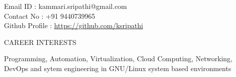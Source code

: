 \documentclass{resume} %
\newcommand{\blank}[1]{\hspace*{#1}}
\begin{document}
\blank{5 cm}
{Email ID} \blank{0.7 cm} :
kammari.sripathi@gmail.com \\
\blank{5 cm} 
{Contact No} \blank{0.3 cm} :
+91 9440739965 \\
\blank{5 cm}
{Github Profile : }
\url{https://github.com/ksripathi}
\sectionlineskip \\


\begin{rSection}{CAREER INTERESTS}
  
  { Programming, Automation, Virtualization, Cloud Computing,
    Networking, DevOps and sytem engineering in GNU/Linux system based
    environments }

\end{rSection}

\end{document}
